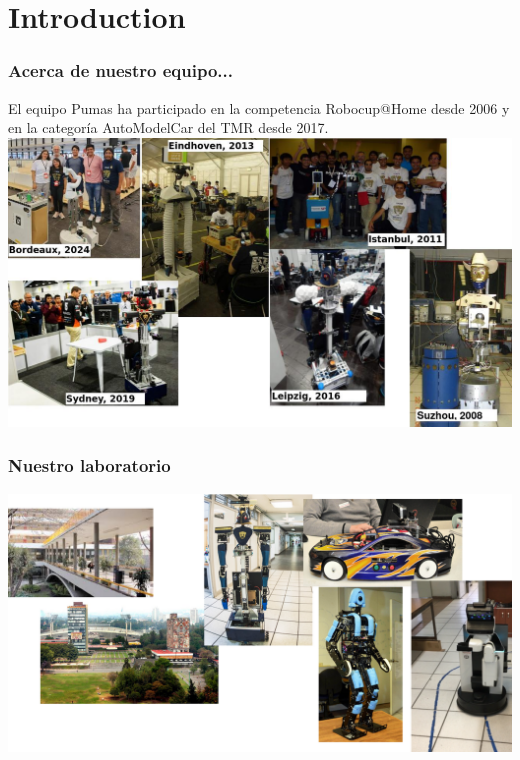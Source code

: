 \section{Introduction}
\begin{frame}\frametitle{Acerca de nuestro equipo...}
  El equipo Pumas ha participado en la competencia Robocup@Home desde 2006 y en la categoría AutoModelCar del TMR desde 2017.
  \includegraphics[width=\textwidth]{Figures/Participations.jpg}
\end{frame}

\begin{frame}\frametitle{Nuestro laboratorio}
  \includegraphics[width=\textwidth]{Figures/Lab.png}
\end{frame}



